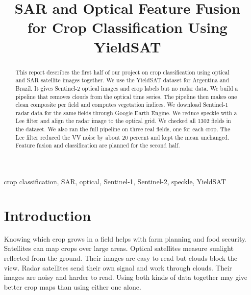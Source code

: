 \documentclass[conference]{IEEEtran}
\begin{document}
\title{SAR and Optical Feature Fusion for Crop Classification Using YieldSAT}

\author{
}

\maketitle

\begin{abstract}
This report describes the first half of our project on crop classification using optical and SAR satellite images together. We use the YieldSAT dataset for Argentina and Brazil. It gives Sentinel-2 optical images and crop labels but no radar data. We build a pipeline that removes clouds from the optical time series. The pipeline then makes one clean composite per field and computes vegetation indices. We download Sentinel-1 radar data for the same fields through Google Earth Engine. We reduce speckle with a Lee filter and align the radar image to the optical grid. We checked all 1302 fields in the dataset. We also ran the full pipeline on three real fields, one for each crop. The Lee filter reduced the VV noise by about 20 percent and kept the mean unchanged. Feature fusion and classification are planned for the second half.
\end{abstract}

\begin{IEEEkeywords}
crop classification, SAR, optical, Sentinel-1, Sentinel-2, speckle, YieldSAT
\end{IEEEkeywords}

\section{Introduction}
Knowing which crop grows in a field helps with farm planning and food security. Satellites can map crops over large areas. Optical satellites measure sunlight reflected from the ground. Their images are easy to read but clouds block the view. Radar satellites send their own signal and work through clouds. Their images are noisy and harder to read. Using both kinds of data together may give better crop maps than using either one alone.
\end{document}
